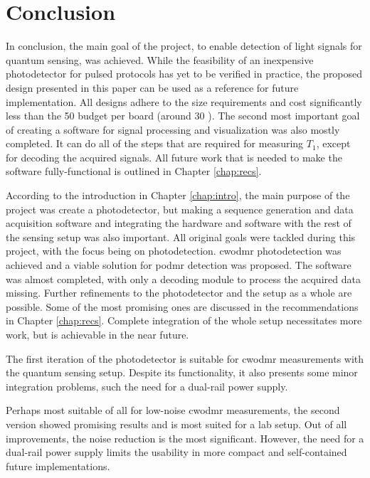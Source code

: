 \chapter{Conclusion}
In conclusion, the main goal of the project, to enable detection of light signals for quantum sensing, was achieved. While the feasibility of an inexpensive photodetector for pulsed protocols has yet to be verified in practice, the proposed design presented in this paper can be used as a reference for future implementation. All designs adhere to the size requirements and cost significantly less than the 50 \texteuro budget per board (around 30 \texteuro). The second most important goal of creating a software for signal processing and visualization was also mostly completed. It can do all of the steps that are required for measuring $T_1$, except for decoding the acquired signals. All future work that is needed to make the software fully-functional is outlined in Chapter \ref{chap:recs}.

According to the introduction in Chapter \ref{chap:intro}, the main purpose of the project was create a photodetector, but making a sequence generation and data acquisition software and integrating the hardware and software with the rest of the sensing setup was also important. All original goals were tackled during this project, with the focus being on photodetection. \gls{cwodmr} photodetection was achieved and a viable solution for \gls{podmr} detection was proposed. The software was almost completed, with only a decoding module to process the acquired data missing. Further refinements to the photodetector and the setup as a whole are possible. Some of the most promising ones are discussed in the recommendations in Chapter \ref{chap:recs}. Complete integration of the whole setup necessitates more work, but is achievable in the near future.

The first iteration of the photodetector is suitable for \gls{cwodmr} measurements with the quantum sensing setup. Despite its functionality, it also presents some minor integration problems, such the need for a dual-rail power supply. 

Perhaps most suitable of all for low-noise \gls{cwodmr} measurements, the second version showed promising results and is most suited for a lab setup. Out of all improvements, the noise reduction is the most significant. However, the need for a dual-rail power supply limits the usability in more compact and self-contained future implementations.

